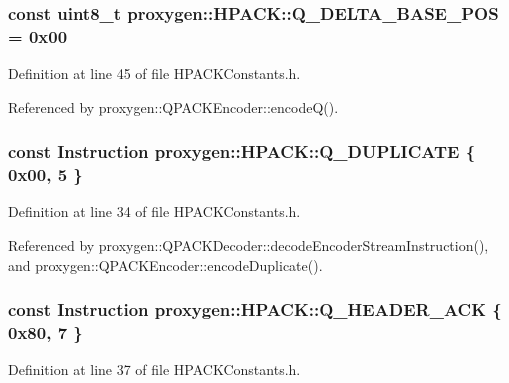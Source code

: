 \subsubsection[{Q\+\_\+\+D\+E\+L\+T\+A\+\_\+\+B\+A\+S\+E\+\_\+\+P\+OS}]{\setlength{\rightskip}{0pt plus 5cm}const uint8\+\_\+t proxygen\+::\+H\+P\+A\+C\+K\+::\+Q\+\_\+\+D\+E\+L\+T\+A\+\_\+\+B\+A\+S\+E\+\_\+\+P\+OS = 0x00}\label{namespaceproxygen_1_1HPACK_a212fc3ecd4fa1f9e3707ca9e032951fb}


Definition at line 45 of file H\+P\+A\+C\+K\+Constants.\+h.



Referenced by proxygen\+::\+Q\+P\+A\+C\+K\+Encoder\+::encode\+Q().

\subsubsection[{Q\+\_\+\+D\+U\+P\+L\+I\+C\+A\+TE}]{\setlength{\rightskip}{0pt plus 5cm}const {\bf Instruction} proxygen\+::\+H\+P\+A\+C\+K\+::\+Q\+\_\+\+D\+U\+P\+L\+I\+C\+A\+TE \{ 0x00, 5 \}}\label{namespaceproxygen_1_1HPACK_aa5739a43a10ca582d3cd829d68de164f}


Definition at line 34 of file H\+P\+A\+C\+K\+Constants.\+h.



Referenced by proxygen\+::\+Q\+P\+A\+C\+K\+Decoder\+::decode\+Encoder\+Stream\+Instruction(), and proxygen\+::\+Q\+P\+A\+C\+K\+Encoder\+::encode\+Duplicate().

\subsubsection[{Q\+\_\+\+H\+E\+A\+D\+E\+R\+\_\+\+A\+CK}]{\setlength{\rightskip}{0pt plus 5cm}const {\bf Instruction} proxygen\+::\+H\+P\+A\+C\+K\+::\+Q\+\_\+\+H\+E\+A\+D\+E\+R\+\_\+\+A\+CK \{ 0x80, 7 \}}\label{namespaceproxygen_1_1HPACK_a5e0f3e2c42fedaa77ce9a44b588da812}


Definition at line 37 of file H\+P\+A\+C\+K\+Constants.\+h.



